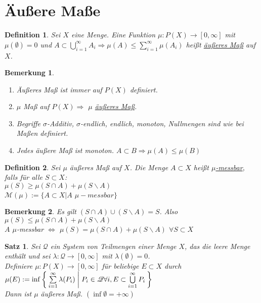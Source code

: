 \documentclass[11pt]{memoir}
\theoremstyle{changebreak}
\newtheorem{Definition}{Definition}[chapter]
\newtheorem{Bemerkung}{Bemerkung}[chapter]
\newtheorem{Satz}{Satz}[chapter]
\begin{document}
\section{Äußere Maße}

\begin{Definition}
Sei $X$ eine Menge. Eine Funktion $\mu: P(X) \rightarrow [0, \infty]$ mit $\mu(\emptyset) = 0$ und $A \subset \bigcup\limits_{i=1}^\infty A_i \Rightarrow \mu(A) \leq \sum\limits_{i=1}^\infty \mu(A_i)$ heißt \underline{äußeres Maß} auf $X$.
\end{Definition}

\begin{Bemerkung}
\begin{enumerate}
	\item Äußeres Maß ist immer auf $P(X)$ definiert.
	\item $\mu$ Maß auf $P(X) \Rightarrow$ $\mu$ \underline{äußeres Maß}.
	\item Begriffe $\sigma$-Additiv, $\sigma$-endlich, endlich, monoton, Nullmengen sind wie bei Maßen definiert.
	\item Jedes äußere Maß ist monoton. $A \subset B \Rightarrow \mu(A) \leq \mu(B)$
\end{enumerate}
\end{Bemerkung}

\begin{Definition}
Sei $\mu$ äußeres Maß auf $X$. Die Menge $A \subset X$ heißt \underline{$\mu$-messbar}, falls für alle $S \subset X$: \\
$\mu(S) \geq \mu(S \cap A) + \mu(S \backslash A)$ \\
$\mathscr M(\mu):= \{ A \subset X | A$ $ \mu-messbar \}$
\end{Definition}

\begin{Bemerkung}
Es gilt $(S \cap A) \cup (S \backslash A) = S$. Also $\mu(S) \leq \mu(S \cap A) + \mu(S \backslash A)$ \\
$A$ $\mu$-messbar $\Leftrightarrow$ $\mu(S) = \mu(S \cap A) + \mu(S \backslash A)$ $\forall S \subset X$
\end{Bemerkung}

\begin{Satz}
Sei $\mathscr Q$ ein System von Teilmengen einer Menge $X$, das die leere Menge enthält und sei $\lambda: \mathscr Q \rightarrow [0, \infty]$ mit $\lambda(\emptyset) = 0$.\\
Definiere $\mu: P(X) \rightarrow [0, \infty]$ für beliebige $E \subset X$ durch \\
 $\mu(E) := \inf \Set{ \sum\limits_{i=1}^\infty \lambda(P_i) | P_i \in \mathscr Q \forall i, E \subset \bigcup\limits_{i=1}^\infty P_i }$ \\
Dann ist $\mu$ äußeres Maß. $(\inf \emptyset = + \infty)$
\end{Satz}
\end{document}
